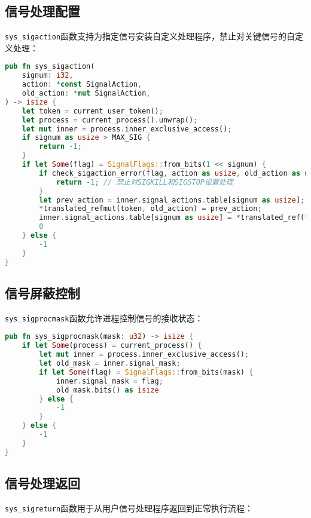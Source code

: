 \subsection{信号处理配置}

\texttt{sys\_sigaction}函数支持为指定信号安装自定义处理程序，禁止对关键信号的自定义处理：

\begin{lstlisting}[language=Rust,caption={信号处理设置}, label={lst:sys-sigaction}]
pub fn sys_sigaction(
    signum: i32,
    action: *const SignalAction,
    old_action: *mut SignalAction,
) -> isize {
    let token = current_user_token();
    let process = current_process().unwrap();
    let mut inner = process.inner_exclusive_access();
    if signum as usize > MAX_SIG {
        return -1;
    }
    if let Some(flag) = SignalFlags::from_bits(1 << signum) {
        if check_sigaction_error(flag, action as usize, old_action as usize) {
            return -1; // 禁止对SIGKILL和SIGSTOP设置处理
        }
        let prev_action = inner.signal_actions.table[signum as usize];
        *translated_refmut(token, old_action) = prev_action;
        inner.signal_actions.table[signum as usize] = *translated_ref(token, action);
        0
    } else {
        -1
    }
}
\end{lstlisting}

\subsection{信号屏蔽控制}

\texttt{sys\_sigprocmask}函数允许进程控制信号的接收状态：

\begin{lstlisting}[language=Rust,caption={信号屏蔽设置}, label={lst:sys-sigprocmask}]
pub fn sys_sigprocmask(mask: u32) -> isize {
    if let Some(process) = current_process() {
        let mut inner = process.inner_exclusive_access();
        let old_mask = inner.signal_mask;
        if let Some(flag) = SignalFlags::from_bits(mask) {
            inner.signal_mask = flag;
            old_mask.bits() as isize
        } else {
            -1
        }
    } else {
        -1
    }
}
\end{lstlisting}

\subsection{信号处理返回}

\texttt{sys\_sigreturn}函数用于从用户信号处理程序返回到正常执行流程：

